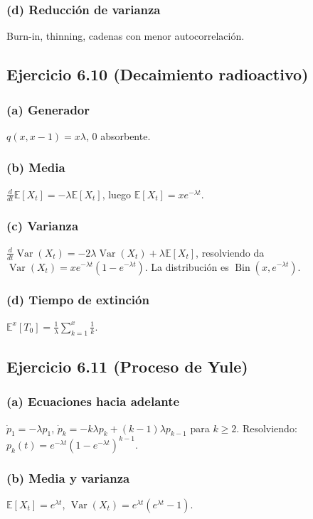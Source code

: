 \documentclass[12pt]{article}
\newcommand{\E}{\mathbb{E}}
\newcommand{\1}{\mathbf{1}}
\newcommand{\Var}{\operatorname{Var}}
\newcommand{\Bin}{\operatorname{Bin}}
\begin{document}
\subsubsection*{(d) Reducci\'on de varianza}
Burn-in, thinning, cadenas con menor autocorrelaci\'on.

\subsection{Ejercicio 6.10 (Decaimiento radioactivo)}

\subsubsection*{(a) Generador}
$q(x,x-1)=x\lambda$, $0$ absorbente.

\subsubsection*{(b) Media}
$\frac{d}{dt}\E[X_t]=-\lambda\E[X_t]$, luego $\E[X_t]=xe^{-\lambda t}$.

\subsubsection*{(c) Varianza}
$\frac{d}{dt}\Var(X_t)=-2\lambda\Var(X_t)+\lambda\E[X_t]$, resolviendo da $\Var(X_t)=xe^{-\lambda t}(1-e^{-\lambda t})$. La distribuci\'on es $\Bin(x,e^{-\lambda t})$.

\subsubsection*{(d) Tiempo de extinci\'on}
$\E^x[T_0]=\frac1\lambda\sum_{k=1}^x\frac1k$.

\subsection{Ejercicio 6.11 (Proceso de Yule)}

\subsubsection*{(a) Ecuaciones hacia adelante}
$\dot{p}_1=-\lambda p_1$, $\dot{p}_k=-k\lambda p_k+(k-1)\lambda p_{k-1}$ para $k\ge2$. Resolviendo: $p_k(t)=e^{-\lambda t}(1-e^{-\lambda t})^{k-1}$.

\subsubsection*{(b) Media y varianza}
$\E[X_t]=e^{\lambda t}$, $\Var(X_t)=e^{\lambda t}(e^{\lambda t}-1)$.
\end{document}
